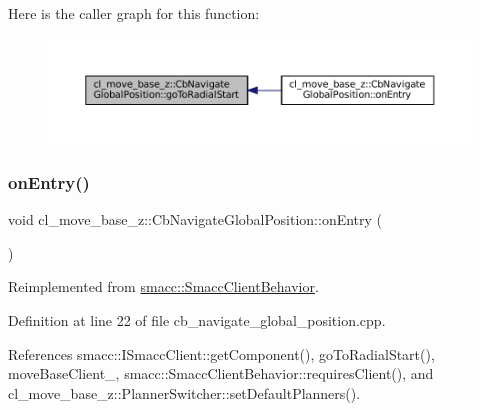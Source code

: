 Here is the caller graph for this function\+:
\nopagebreak
\begin{figure}[H]
\begin{center}
\leavevmode
\includegraphics[width=350pt]{classcl__move__base__z_1_1CbNavigateGlobalPosition_a489aaab9282dea9253fcf6b02e5f8aa4_icgraph}
\end{center}
\end{figure}
\mbox{\label{classcl__move__base__z_1_1CbNavigateGlobalPosition_a66d8b0555ef2945bc108dcd5171be292}} 
\subsubsection{\texorpdfstring{on\+Entry()}{onEntry()}}
{\footnotesize\ttfamily void cl\+\_\+move\+\_\+base\+\_\+z\+::\+Cb\+Navigate\+Global\+Position\+::on\+Entry (\begin{DoxyParamCaption}{ }\end{DoxyParamCaption})\hspace{0.3cm}{\ttfamily [virtual]}}



Reimplemented from \hyperlink{classsmacc_1_1SmaccClientBehavior_a7962382f93987c720ad432fef55b123f}{smacc\+::\+Smacc\+Client\+Behavior}.



Definition at line 22 of file cb\+\_\+navigate\+\_\+global\+\_\+position.\+cpp.



References smacc\+::\+I\+Smacc\+Client\+::get\+Component(), go\+To\+Radial\+Start(), move\+Base\+Client\+\_\+, smacc\+::\+Smacc\+Client\+Behavior\+::requires\+Client(), and cl\+\_\+move\+\_\+base\+\_\+z\+::\+Planner\+Switcher\+::set\+Default\+Planners().


